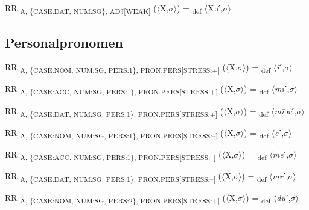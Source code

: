 {\begin{exe}
 RR \textsubscript{A, \{CASE:DAT, NUM:SG\}, ADJ[WEAK]} ($\langle$X,$\sigma $$\rangle$) = \textsubscript{def} $\langle$X\textit{ə}ˊ,$\sigma $$\rangle$
\end{exe}

\subsection{Personalpronomen}

\begin{exe}
 RR \textsubscript{A, \{CASE:NOM, NUM:SG, PERS:1\}, PRON.PERS[STRESS:+]} ($\langle$X,$\sigma $$\rangle$) = \textsubscript{def} $\langle$\textit{\=i}ˊ,$\sigma $$\rangle$
\end{exe}

\begin{exe}
 RR \textsubscript{A, \{CASE:ACC, NUM:SG, PERS:1\}, PRON.PERS[STRESS:+]} ($\langle$X,$\sigma $$\rangle$) = \textsubscript{def} $\langle$\textit{m\=i}ˊ,$\sigma $$\rangle$
\end{exe}

\begin{exe}
 RR \textsubscript{A, \{CASE:DAT, NUM:SG, PERS:1\}, PRON.PERS[STRESS:+]} ($\langle$X,$\sigma $$\rangle$) = \textsubscript{def} $\langle$\textit{m\=iər}ˊ,$\sigma $$\rangle$
\end{exe}

\begin{exe}
 RR \textsubscript{A, \{CASE:NOM, NUM:SG, PERS:1\}, PRON.PERS[STRESS:–]} ($\langle$X,$\sigma $$\rangle$) = \textsubscript{def} $\langle$\textit{e}ˊ,$\sigma $$\rangle$
\end{exe}

\begin{exe}
 RR \textsubscript{A, \{CASE:ACC, NUM:SG, PERS:1\}, PRON.PERS[STRESS:–]} ($\langle$X,$\sigma $$\rangle$) = \textsubscript{def} $\langle$\textit{me}ˊ,$\sigma $$\rangle$
\end{exe}

\begin{exe}
 RR \textsubscript{A, \{CASE:DAT, NUM:SG, PERS:1\}, PRON.PERS[STRESS:–]} ($\langle$X,$\sigma $$\rangle$) = \textsubscript{def} $\langle$\textit{mr}ˊ,$\sigma $$\rangle$
\end{exe}

\begin{exe}
 RR \textsubscript{A, \{CASE:NOM, NUM:SG, PERS:2\}, PRON.PERS[STRESS:+]} ($\langle$X,$\sigma $$\rangle$) = \textsubscript{def} $\langle$\textit{d\=u}ˊ,$\sigma $$\rangle$
\end{exe}

}
